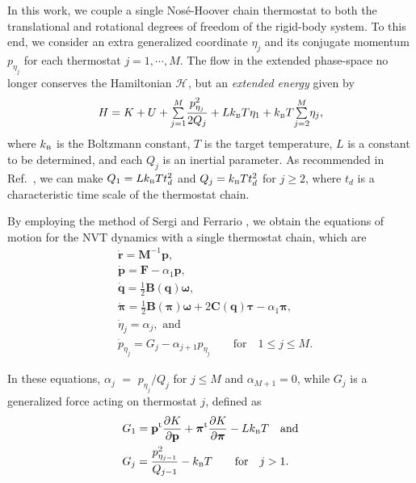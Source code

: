 \documentclass[
	aip,
	jcp,
	reprint,
]{revtex4-1}
\newcommand{\mt}[1]{\boldsymbol{\mathbf{#1}}}          %
\newcommand{\vt}[1]{\boldsymbol{\mathbf{#1}}}          %
\newcommand{\tr}[1]{#1^\text{t}}                       %
\newcommand{\diff}[2]{\frac{\partial #1}{\partial #2}} %
\newcommand{\Ham}[1]{{\mathcal H}_\text{#1}}           %
\newcommand{\mini}[1]{\text{\tiny{#1}}}
\begin{document}
In this work, we couple a single Nos\'{e}-Hoover chain thermostat \cite{Martyna_1992} to both the translational and rotational degrees of freedom of the rigid-body system.
To this end, we consider an extra generalized coordinate $\eta_j$ and its conjugate momentum $p_{\eta_j}$ for each thermostat $j = 1, \cdots, M$.
The flow in the extended phase-space no longer conserves the Hamiltonian $\Ham{}$, but an \textit{extended energy} given by \cite{Martyna_1992}
\begin{equation}
\label{eq:nvt extended energy}
H = K + U + {\textstyle\sum\limits_{j=1}^{M}} \frac{p_{\eta_j}^2}{2Q_j} + L k_\mini{B} T\eta_1 + k_\mini{B} T {\textstyle\sum\limits_{j=2}^{M}} \eta_j,
\end{equation}
where $k_\mini{B}$ is the Boltzmann constant, $T$ is the target temperature, $L$ is a constant to be determined, and each $Q_j$ is an inertial parameter.
As recommended in Ref.~, we can make $Q_1 = L k_\mini{B} T t_d^2$ and $Q_j = k_\mini{B} T t_d^2$ for $j \geq 2$, where $t_d$ is a characteristic time scale of the thermostat chain.

By employing the method of Sergi and Ferrario \cite{Sergi_2001}, we obtain the equations of motion for the NVT dynamics with a single thermostat chain, which are
\begin{subequations}
	\label{eq:ODE system for NVT}
	\begin{align}
\label{eq:nhc_r}
	&\dot{\vt r} =
	{\mt M}^{-1} {\vt p}, \\
%
\label{eq:nhc_p} 
	&\dot{\vt p} =
	{\vt F} - \alpha_1 {\vt p},\\
%
\label{eq:nhc_q}
	&\dot{\vt q} =
	\frac{1}{2} \mt B(\vt q) \vt \omega, \\
%
\label{eq:nhc_pi}
	&\dot{\vt \pi} =
	\frac{1}{2} \mt B(\vt \pi) \vt \omega + 2 \mt C(\vt q) \vt \tau - \alpha_1 {\vt \pi}, \\
%
\label{eq:nhc_eta}
	&\dot{\eta}_j = \alpha_j, \text{ and} \\
%
\label{eq:nhc_p_eta}
	&{\dot p}_{\eta_j} = G_j - \alpha_{j+1} p_{\eta_j} \qquad \text{for} \quad 1 \leq j \le M.
	\end{align}
\end{subequations}

In these equations, $\alpha_j$ $=$ ${p_{\eta_j}}/{Q_j}$ for $j \le M$ and $\alpha_{M+1} = 0$, while $G_j$ is a generalized force acting on thermostat $j$, defined as
\begin{subequations}
\begin{align}
\label{eq:generalized force NVT}
&G_1 = \tr{\vt p} \diff{K}{\vt p} + \tr{\vt \pi} \diff{K}{\vt \pi} - L k_\mini{B} T \quad \text{and}\\
&G_j = \frac{p_{\eta_{j-1}}^2}{Q_{j-1}} - k_\mini{B} T  \qquad \text{for} \quad j > 1.
\end{align}
\end{subequations}
\end{document}
